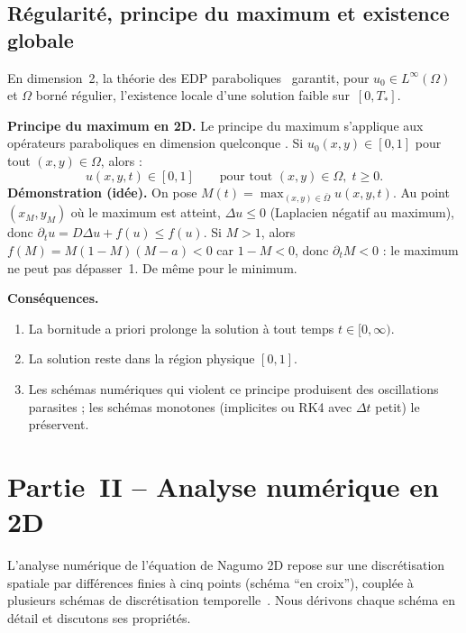 \documentclass[11pt,a4paper]{report}
\begin{document}
\section{R\'egularit\'e, principe du maximum et existence globale}

En dimension~2, la th\'eorie des EDP paraboliques~\cite{EvansGariepy2015} garantit,
pour $u_0\in L^\infty(\Omega)$ et $\Omega$ born\'e r\'egulier, l'existence locale
d'une solution faible sur~$[0,T_*]$.

\textbf{Principe du maximum en 2D.}
Le principe du maximum s'applique aux op\'erateurs paraboliques en dimension quelconque
\cite{Protter1967}. Si $u_0(x,y)\in[0,1]$ pour tout $(x,y)\in\Omega$, alors :
\begin{equation}
  u(x,y,t)\in[0,1]\qquad\text{pour tout }(x,y)\in\Omega,\; t\ge 0.
\end{equation}
\textbf{D\'emonstration (id\'ee).} On pose $M(t)=\max_{(x,y)\in\bar\Omega}u(x,y,t)$.
Au point $(x_M,y_M)$ o\`u le maximum est atteint, $\Delta u \le 0$ (Laplacien
n\'egatif au maximum), donc $\partial_t u = D\Delta u + f(u)\le f(u)$.
Si $M>1$, alors $f(M)=M(1-M)(M-a)<0$ car $1-M<0$, donc $\partial_t M<0$ :
le maximum ne peut pas d\'epasser~1. De m\^eme pour le minimum.

\textbf{Cons\'equences.}
\begin{enumerate}[leftmargin=2em]
  \item La bornitude a priori prolonge la solution \`a tout temps $t\in[0,\infty)$.
  \item La solution reste dans la r\'egion physique $[0,1]$.
  \item Les sch\'emas num\'eriques qui violent ce principe produisent des oscillations
        parasites ; les sch\'emas monotones (implicites ou RK4 avec $\Delta t$ petit)
        le pr\'eservent.
\end{enumerate}

\chapter{Partie~II -- Analyse num\'erique en 2D}

L'analyse num\'erique de l'\'equation de Nagumo 2D repose sur une discr\'etisation
spatiale par diff\'erences finies \`a cinq points (sch\'ema ``en croix''), coupl\'ee \`a
plusieurs sch\'emas de discr\'etisation temporelle~\cite{Strikwerda2004,LeVeque2007}.
Nous d\'erivons chaque sch\'ema en d\'etail et discutons ses propri\'et\'es.
\end{document}
